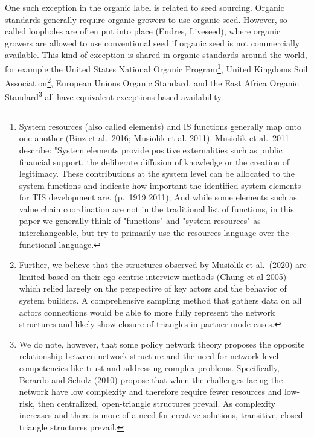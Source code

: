 \documentclass[twoside,12pt,final]{ucthesis-CA2012}
\begin{document}
\begin{ucmainmatter}
One such exception in the organic label is related to seed sourcing.
Organic standards generally require organic growers to use organic seed.
However, so-called \textquotesingle loopholes\textquotesingle{} are often put into place (Endres,
Liveseed), where organic growers are allowed to use conventional seed if
organic seed is not commercially available. This kind of exception is
shared in organic standards around the world, for example the United
States\textquotesingle{} National Organic Program\footnote{System resources (also called \textquotesingle elements\textquotesingle) and IS functions
  generally map onto one another (Binz et al.~2016; Musiolik et al.
  2011). Musiolik et al.~2011 describe: "System elements provide
  positive externalities such as public financial support, the
  deliberate diffusion of knowledge or the creation of legitimacy.
  These contributions at the system level can be allocated to the
  system functions and indicate how important the identified system
  elements for TIS development are.\textquotesingle{} (p.~1919 2011); And while some
  elements such as \textquotesingle value chain coordination\textquotesingle{} are not in the
  traditional list of functions, in this paper we generally think of
  "functions" and "system resources" as interchangeable, but try
  to primarily use the \textquotesingle resources\textquotesingle{} language over the \textquotesingle functional\textquotesingle{}
  language.}, United Kingdom\textquotesingle s Soil
Association\footnote{Further, we believe that the structures observed by Musiolik et
  al.~(2020) are limited based on their \textquotesingle ego-centric\textquotesingle{} interview
  methods (Chung et al 2005) which relied largely on the perspective
  of key actors and the behavior of system builders. A comprehensive
  sampling method that gathers data on all actors\textquotesingle{} connections would
  be able to more fully represent the network structures and likely
  show \textquotesingle closure\textquotesingle{} of triangles in partner mode cases.}, European Union\textquotesingle s Organic Standard, and the East Africa
Organic Standard\footnote{We do note, however, that some policy network theory proposes the
  opposite relationship between network structure and the need for
  network-level competencies like trust and addressing complex
  problems. Specifically, Berardo and Scholz (2010) propose that when
  the challenges facing the network have low complexity and therefore
  require fewer resources and low-risk, then centralized,
  open-triangle structures prevail. As complexity increases and there
  is more of a need for creative solutions, transitive,
  closed-triangle structures prevail.} all have equivalent exceptions based availability.


\end{ucmainmatter}
\end{document}
